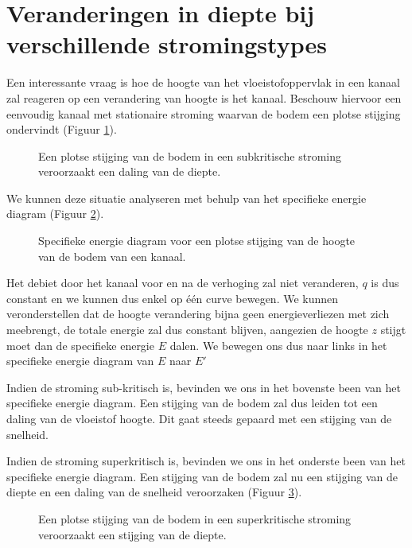 	\section{Veranderingen in diepte bij verschillende stromingstypes}
Een interessante vraag is hoe de hoogte van het vloeistofoppervlak in een kanaal zal reageren op een verandering van hoogte is het kanaal. Beschouw hiervoor een eenvoudig kanaal met stationaire stroming waarvan de bodem een plotse stijging ondervindt (Figuur \ref{fig:Open_kanaal_bodemstijging_subkritisch}). 
\begin{figure}[htb]
	\centering
	
	\caption{Een plotse stijging van de bodem in een subkritische stroming veroorzaakt een daling van de diepte.}
	\label{fig:Open_kanaal_bodemstijging_subkritisch}
\end{figure}
We kunnen deze situatie analyseren met behulp van het specifieke energie diagram (Figuur \ref{fig:Specifieke_energie_diagram_bodemstijging}).

\begin{figure}[htb]
	\centering
	
	\caption{Specifieke energie diagram voor een plotse stijging van de hoogte van de bodem van een kanaal.}
	\label{fig:Specifieke_energie_diagram_bodemstijging}
\end{figure}

Het debiet door het kanaal voor en na de verhoging zal niet veranderen, $q$ is dus constant en we kunnen dus enkel op één curve bewegen. We kunnen veronderstellen dat de hoogte verandering bijna geen energieverliezen met zich meebrengt, de totale energie zal dus constant blijven, aangezien de hoogte $z$ stijgt moet dan de specifieke energie $E$ dalen. We bewegen ons dus naar links in het specifieke energie diagram van $E$ naar $E'$

Indien de stroming sub-kritisch is, bevinden we ons in het bovenste been van het specifieke energie diagram. Een stijging van de bodem zal dus leiden tot een daling van de vloeistof hoogte. Dit gaat steeds gepaard met een stijging van de snelheid.

Indien de stroming superkritisch is, bevinden we ons in het onderste been van het specifieke energie diagram. Een stijging van de bodem zal nu een stijging van de diepte en een daling van de snelheid veroorzaken (Figuur \ref{fig:Open_kanaal_bodemstijging_superkritisch}). 
\begin{figure}[htb]
	\centering
	
	\caption{Een plotse stijging van de bodem in een superkritische stroming veroorzaakt een stijging van de diepte.}
	\label{fig:Open_kanaal_bodemstijging_superkritisch}
\end{figure}

